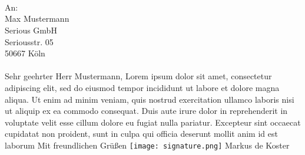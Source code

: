 \begin{minipage}[t]{0.3\textwidth}\vspace{0pt}%
	\begin{center}
		\mypic
        \mycontact
	\end{center}
	\vfill
\end{minipage} %
%
\hfill
\begin{minipage}[t]{0.65\textwidth}\vspace{28pt}%
	\\ %
	\color{medium-gray}
	\normalsize \MakeUppercase{\so{\coverletter}} \\
	\\
    An:\\
    Max Mustermann\\
    Serious GmbH\\
    Seriousstr. 05\\
    50667 Köln\\
    
    \bigbreak
    \\
    \renewcommand{\\}{\vspace*{0.8\baselineskip} \newline}
    Sehr geehrter Herr Mustermann,\\
    Lorem ipsum dolor sit amet, consectetur adipiscing elit, 
	sed do eiusmod tempor incididunt ut labore et dolore magna aliqua. 
	Ut enim ad minim veniam, 
	quis nostrud exercitation ullamco laboris nisi ut aliquip ex ea commodo consequat. 
	Duis aute irure dolor in reprehenderit in voluptate velit esse cillum dolore eu fugiat nulla pariatur. 
	Excepteur sint occaecat cupidatat non proident, 
	sunt in culpa qui officia deserunt mollit anim id est laborum\\
    Mit freundlichen Grüßen
    \bigbreak
	\texttt{[image: signature.png]}\\ %
    Markus de Koster
\end{minipage}